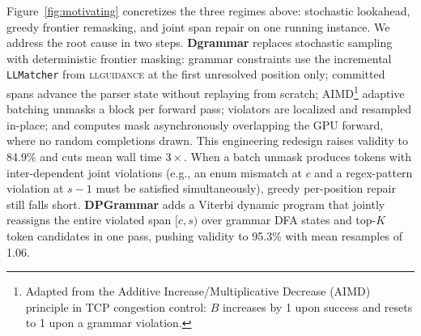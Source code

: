 Figure~\ref{fig:motivating} concretizes the three regimes above: stochastic lookahead, greedy frontier remasking, and joint span repair on one running instance. We address the root cause in two steps. \textbf{Dgrammar} replaces stochastic sampling with deterministic frontier masking: grammar constraints use the incremental \texttt{LLMatcher} from \textsc{llguidance} \citep{microsoft2025llguidance} at the first unresolved position only; committed spans advance the parser state without replaying from scratch; AIMD\footnote{Adapted from the Additive Increase/Multiplicative Decrease (AIMD) principle in TCP congestion control: $B$ increases by 1 upon success and resets to 1 upon a grammar violation.} adaptive batching unmasks a block per forward pass; violators are localized and resampled in-place; and computes mask asynchronously overlapping the GPU forward, where no random completions drawn. This engineering redesign raises validity to 84.9\% and cuts mean wall time $3\times$. When a batch unmask produces tokens with inter-dependent joint violations (e.g., an enum mismatch at $c$ and a regex-pattern violation at $s{-}1$ must be satisfied simultaneously), greedy per-position repair still falls short. \textbf{DPGrammar} adds a Viterbi dynamic program that jointly reassigns the entire violated span $[c,s)$ over grammar DFA states and top-$K$ token candidates in one pass, pushing validity to 95.3\% with mean resamples of 1.06.



